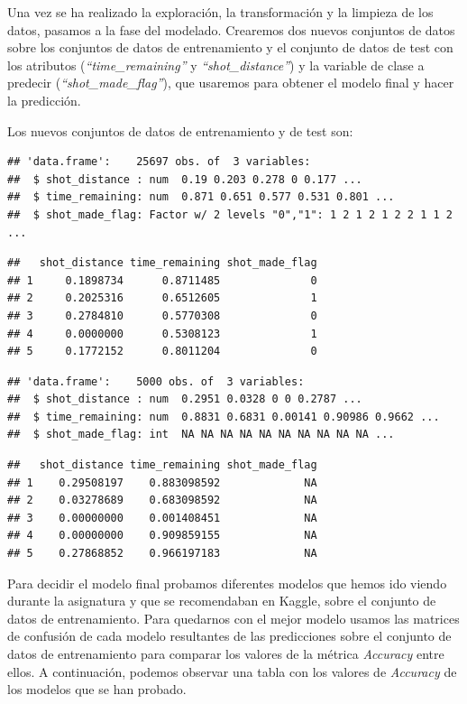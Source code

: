 \documentclass[
]{article}
\begin{document}
Una vez se ha realizado la exploración, la transformación y la limpieza
de los datos, pasamos a la fase del modelado. Crearemos dos nuevos
conjuntos de datos sobre los conjuntos de datos de entrenamiento y el
conjunto de datos de test con los atributos (\emph{``time\_remaining''}
y \emph{``shot\_distance''}) y la variable de clase a predecir
(\emph{``shot\_made\_flag''}), que usaremos para obtener el modelo final
y hacer la predicción.

Los nuevos conjuntos de datos de entrenamiento y de test son:

\begin{verbatim}
## 'data.frame':    25697 obs. of  3 variables:
##  $ shot_distance : num  0.19 0.203 0.278 0 0.177 ...
##  $ time_remaining: num  0.871 0.651 0.577 0.531 0.801 ...
##  $ shot_made_flag: Factor w/ 2 levels "0","1": 1 2 1 2 1 2 2 1 1 2 ...
\end{verbatim}

\begin{verbatim}
##   shot_distance time_remaining shot_made_flag
## 1     0.1898734      0.8711485              0
## 2     0.2025316      0.6512605              1
## 3     0.2784810      0.5770308              0
## 4     0.0000000      0.5308123              1
## 5     0.1772152      0.8011204              0
\end{verbatim}

\begin{verbatim}
## 'data.frame':    5000 obs. of  3 variables:
##  $ shot_distance : num  0.2951 0.0328 0 0 0.2787 ...
##  $ time_remaining: num  0.8831 0.6831 0.00141 0.90986 0.9662 ...
##  $ shot_made_flag: int  NA NA NA NA NA NA NA NA NA NA ...
\end{verbatim}

\begin{verbatim}
##   shot_distance time_remaining shot_made_flag
## 1    0.29508197    0.883098592             NA
## 2    0.03278689    0.683098592             NA
## 3    0.00000000    0.001408451             NA
## 4    0.00000000    0.909859155             NA
## 5    0.27868852    0.966197183             NA
\end{verbatim}

Para decidir el modelo final probamos diferentes modelos que hemos ido
viendo durante la asignatura y que se recomendaban en Kaggle, sobre el
conjunto de datos de entrenamiento. Para quedarnos con el mejor modelo
usamos las matrices de confusión de cada modelo resultantes de las
predicciones sobre el conjunto de datos de entrenamiento para comparar
los valores de la métrica \emph{Accuracy} entre ellos. A continuación,
podemos observar una tabla con los valores de \emph{Accuracy} de los
modelos que se han probado.
\end{document}
